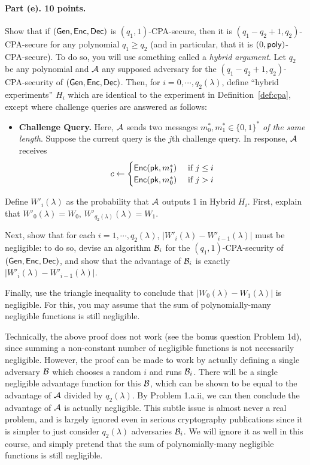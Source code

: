 \documentclass{article}
\begin{document}
\paragraph{Part (e). 10 points.} Show that if $({\sf Gen},{\sf Enc},{\sf Dec})$ is $(q_1,1)$-CPA-secure, then it is $(q_1-q_2+1,q_2)$-CPA-secure for any polynomial $q_1\geq q_2$ (and in particular, that it is $(0,{\sf poly})$-CPA-secure). To do so, you will use something called a \emph{hybrid argument}. Let $q_2$ be any polynomial and ${\mathcal{A}}$ any supposed adversary for the $(q_1-q_2+1,q_2)$-CPA-security of $({\sf Gen},{\sf Enc},{\sf Dec})$.  Then, for $i=0,\cdots,q_2(\lambda)$, define ``hybrid experiments'' $H_i$ which are identical to the experiment in Definition~\ref{def:cpa}, except where challenge queries are answered as follows:
\begin{itemize}
    \item {\bf Challenge Query.} Here, ${\mathcal{A}}$ sends two messages $m_0^*,m_1^*\in\{0,1\}^*$ \emph{of the same length}. Suppose the current query is the $j$th challenge query. In response, ${\mathcal{A}}$ receives 
    \[c\gets\begin{cases}
        {\sf Enc}({\sf pk},m_1^*)&\text{ if }j\leq i\\
        {\sf Enc}({\sf pk},m_0^*)&\text{ if }j>i\end{cases}\]
\end{itemize}
Define $W'_i(\lambda)$ as the probability that ${\mathcal{A}}$ outputs 1 in Hybrid $H_i$. First, explain that $W'_0(\lambda)=W_0$, $W'_{q_2(\lambda)}(\lambda)=W_1$. 

Next, show that for each $i=1,\cdots,q_2(\lambda)$, $|W'_i(\lambda)-W'_{i-1}(\lambda)|$ must be negligible: to do so, devise an algorithm ${\mathcal{B}}_i$ for the $(q_1,1)$-CPA-security of $({\sf Gen},{\sf Enc},{\sf Dec})$, and show that the advantage of ${\mathcal{B}}_i$ is exactly $|W'_i(\lambda)-W'_{i-1}(\lambda)|$.

Finally, use the triangle inequality to conclude that $|W_0(\lambda)-W_1(\lambda)|$ is negligible. For this, you may assume that the sum of polynomially-many negligible functions is still negligible.

\begin{remark}Technically, the above proof does not work (see the bonus question Problem 1d), since summing a non-constant number of negligible functions is not necessarily negligible. However, the proof can be made to work by actually defining a single adversary ${\mathcal{B}}$ which chooses a random $i$ and runs ${\mathcal{B}}_i$. There will be a single negligible advantage function for this ${\mathcal{B}}$, which can be shown to be equal to the advantage of ${\mathcal{A}}$ divided by $q_2(\lambda)$. By Problem 1.a.ii, we can then conclude the advantage of ${\mathcal{A}}$ is actually negligible. This subtle issue is almost never a real problem, and is largely ignored even in serious cryptography publications since it is simpler to just consider $q_2(\lambda)$ adversaries ${\mathcal{B}}_i$. We will ignore it as well in this course, and simply pretend that the sum of polynomially-many negligible functions is still negligible.
\end{remark}
\end{document}

